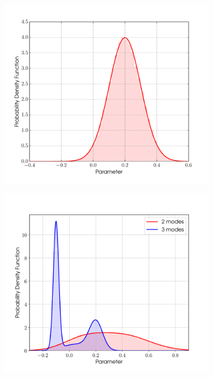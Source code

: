 \begin{figure}[!phtb]
\begin{center}
\includegraphics[width=1\columnwidth]{./figures/priors/gaussian/gaussian}
\caption{ \protect}
\end{center}
\end{figure}


\begin{figure}[!phtb]
\begin{center}
\includegraphics[width=1\columnwidth]{./figures/priors/gmm/gmm}
\caption{ \protect}
\end{center}
\end{figure}


